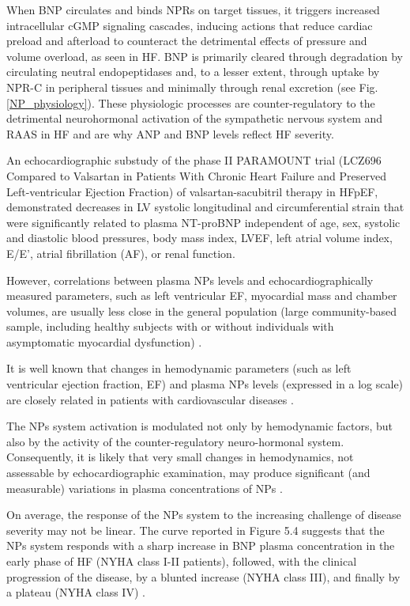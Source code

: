 \documentclass[14pt,a4paper,onecolumn]{extarticle}
\begin{document}
When BNP circulates and binds NPRs on target tissues, it triggers increased intracellular cGMP signaling cascades, inducing actions that reduce cardiac preload and afterload to counteract the detrimental effects of pressure and volume overload, as seen in HF. BNP is primarily cleared through degradation by circulating neutral endopeptidases and, to a lesser extent, through uptake by NPR-C in peripheral tissues and minimally through renal excretion (see Fig. \ref{NP_physiology}). These physiologic processes are counter-regulatory to the detrimental neurohormonal activation of the sympathetic nervous system and RAAS in HF and are why ANP and BNP levels reflect HF severity. \citep{Potter2011} %

An echocardiographic substudy of the phase II PARAMOUNT trial (LCZ696 Compared to Valsartan in Patients With Chronic Heart Failure and Preserved Left-ventricular Ejection Fraction) of valsartan-sacubitril therapy in HFpEF, demonstrated decreases in LV systolic longitudinal and circumferential strain that were significantly related to plasma NT-proBNP independent of age, sex, systolic and diastolic blood pressures, body mass index, LVEF, left atrial volume index, E/E’, atrial fibrillation (AF), or renal function. \citep{Kraigher-Krainer2014} %

However, correlations between plasma NPs levels and echocardiographically measured parameters, such as left ventricular EF, myocardial mass and chamber volumes, are usually less close in the general population (large community-based sample, including healthy subjects with or without individuals with asymptomatic myocardial dysfunction) \citep{bib38} \citep{bib39} \citep{bib366} \citep{bib367}. %

It is well known that changes in hemodynamic parameters (such as left ventricular ejection fraction, EF) and plasma NPs levels (expressed in a log scale) are closely related in patients with cardiovascular diseases  \citep{bib32} \citep{bib33} \citep{bib34} \citep{bib35}  \citep{bib360} \citep{bib363} \citep{bib364}. %

The NPs system activation is modulated not only by hemodynamic factors, but also by the activity of the counter-regulatory neuro-hormonal system. Consequently, it is likely that very small changes in hemodynamics, not assessable by echocardiographic examination, may produce significant (and measurable) variations in plasma concentrations of NPs \citep{bib360}. %

On average, the response of the NPs system to the increasing challenge of disease severity may not be linear. The curve reported in Figure 5.4 suggests that the NPs system responds with a sharp increase in BNP plasma concentration in the early phase of HF (NYHA class I-II patients), followed, with the clinical progression of the disease, by a blunted increase (NYHA class III), and finally by a plateau (NYHA class IV) \citep{bib333}. %
\end{document}
